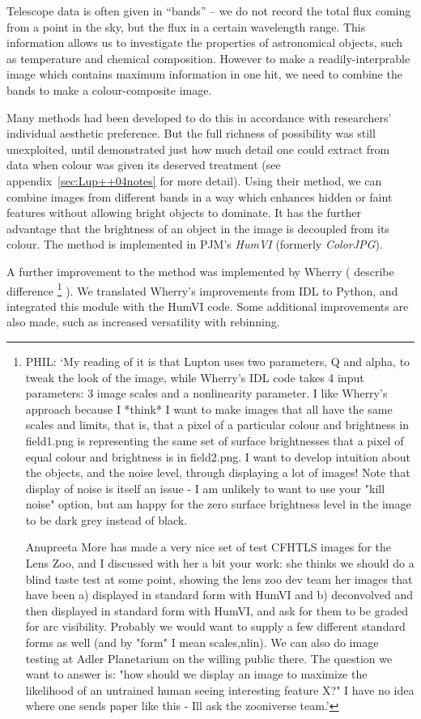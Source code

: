 \documentclass[letterpaper, 11pt]{article}
\def\MORE{{\color{red}{\bf MORE}}\xspace}
\begin{document}
Telescope data is often given in ``bands'' -- we do not record the total flux coming from a point in the sky, but the flux in a certain wavelength range. This information allows us to investigate the properties of astronomical objects, such as temperature and chemical composition. However to make a readily-interprable image which contains maximum information in one hit, we need to combine the bands to make a colour-composite image.

Many methods had been developed to do this in accordance with researchers' individual aesthetic preference. But the full richness of possibility was still unexploited, until \citet{Lup++04} demonstrated just how much detail one could extract from data when colour was given its deserved treatment (see appendix~\ref{sec:Lup++04notes} for more detail). Using their method, we can combine images from different bands in a way which enhances hidden or faint features without allowing bright objects to dominate. It has the further advantage that the brightness of an object in the image is decoupled from its colour. The method is implemented in PJM's \emph{HumVI} (formerly \emph{ColorJPG}).

A further improvement to the method was implemented by Wherry (\MORE describe difference
\footnote{PHIL: `My reading of it is that Lupton uses two parameters, Q and alpha, to
tweak the look of the image, while Wherry's IDL code takes 4 input
parameters: 3 image scales and a nonlinearity parameter.
I like Wherry's approach because I *think* I want to make images that
all have the same scales and limits, that is, that a pixel of a
particular colour and brightness in field1.png is representing the
same set of surface brightnesses that a pixel of equal colour and
brightness is in field2.png. I want to develop intuition about the
objects, and the noise level, through displaying a lot of images! Note
that display of noise is itself an issue - I am unlikely to want to
use your "kill noise" option, but am happy for the zero surface
brightness level in the image to be dark grey instead of black.

Anupreeta More has made a very nice set of test CFHTLS images for the
Lens Zoo, and I discussed with her a bit your work: she thinks we
should do a blind taste test at some point, showing the lens zoo dev
team her images that have been a) displayed in standard form with
HumVI and b) deconvolved and then
displayed in standard form with HumVI, and ask for them to be graded
for arc visibility. Probably we would want to supply a few different
standard forms as well (and by "form" I mean {scales,nlin}). We can
also do image testing at Adler Planetarium on the willing public
there. The question we want to answer is: "how should we display an
image to maximize the likelihood of an untrained human seeing
interesting feature X?"  I have no idea where one sends paper like
this - Ill ask the zooniverse team.'}
). We translated Wherry's improvements from IDL to Python, and integrated this module with the HumVI code. Some additional improvements are also made, such as increased versatility with rebinning.
\end{document}
